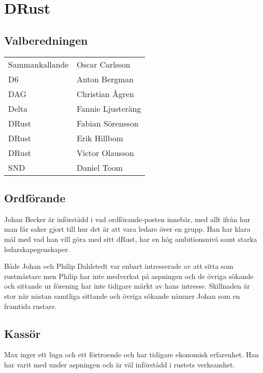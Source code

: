 \section{DRust}

\subsection{Valberedningen}
\begin{autoframe}

\begin{tabular}{ll}
Sammankallande & Oscar Carlsson \\
D6 & Anton Bergman \\
DAG  & Christian Ågren \\
Delta  & Fannie Ljusteräng \\
DRust & Fabian Sörensson \\
DRust & Erik Hillbom \\
DRust & Victor Olausson \\
SND  & Daniel Toom
\end{tabular}

\end{autoframe}


\subsection{Ordförande}
\begin{autoframe}

Johan Becker är införstådd i vad ordförande-posten innebär, med allt ifrån hur man får saker gjort till hur det är att vara ledare över en grupp.  Han har klara mål med vad han vill göra med sitt dRust, har en hög ambitionsnivå samt starka ledarskapegenskaper.

\bigskip
Både Johan och Philip Dahlstedt var enbart intresserade av att sitta som rustmästare men Philip har inte medverkat på aspningen och de övriga sökande och sittande ur förening har inte tidigare märkt av hans intresse. Skillnaden är stor när nästan samtliga sittande och övriga sökande nämner Johan som en framtida rustare.
\end{autoframe}

\subsection{Kassör}
\begin{autoframe}

Max inger ett lugn och ett förtroende och har tidigare ekonomisk erfarenhet. Han har varit med under aspningen och är väl införstådd i rustets verksamhet.
\end{autoframe}

